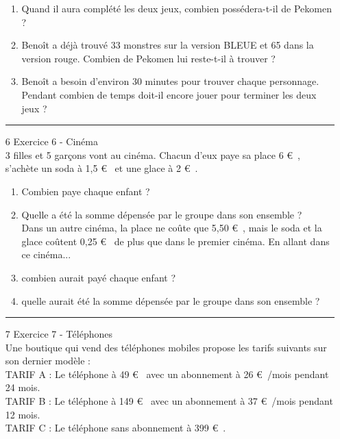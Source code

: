 \documentclass[11pt]{article}
\begin{document}
\begin{multicols}{2}
\begin{enumerate}
\begin{enumerate}
  \item Quand il aura complété les deux jeux, combien possédera-t-il de Pekomen ?
  \item Benoît a déjà trouvé 33 monstres sur la version BLEUE et 65 dans la version rouge.
Combien de Pekomen lui reste-t-il à trouver ?
  \item Benoît a besoin d’environ 30 minutes pour trouver chaque personnage. \\
Pendant combien de temps doit-il encore jouer pour terminer les deux jeux ?
  \end{enumerate}
\rule{\linewidth}{0.5pt}
\item[6] Exercice 6 - Cinéma\\
  3 filles et 5 garçons vont au cinéma. Chacun d’eux paye sa place 6 \euro~, s’achète un soda à 1,5 \euro~ et une glace à 2 \euro~.
  \begin{enumerate}
  \item Combien paye chaque enfant ?
  \item Quelle a été la somme dépensée par le groupe dans son ensemble ?\\
    Dans un autre cinéma, la place ne coûte que 5,50 \euro~, mais le soda et la glace coûtent 0,25 \euro~ de plus que dans le premier cinéma. En allant dans ce cinéma...
  \item combien aurait payé chaque enfant ?
  \item quelle aurait été la somme dépensée par le groupe dans son ensemble ?
  \end{enumerate}
\rule{\linewidth}{0.5pt}
\item[7] Exercice 7 - Téléphones\\
  Une boutique qui vend des téléphones mobiles propose les tarifs suivants sur son dernier modèle :\\
  TARIF A : Le téléphone à 49 \euro~ avec un abonnement à 26 \euro~/mois pendant 24 mois.\\
  TARIF B : Le téléphone à 149 \euro~ avec un abonnement à 37 \euro~/mois pendant 12 mois.\\
  TARIF C : Le téléphone sans abonnement à 399 \euro~.\\
  

\end{enumerate}
\end{multicols}
\end{document}

